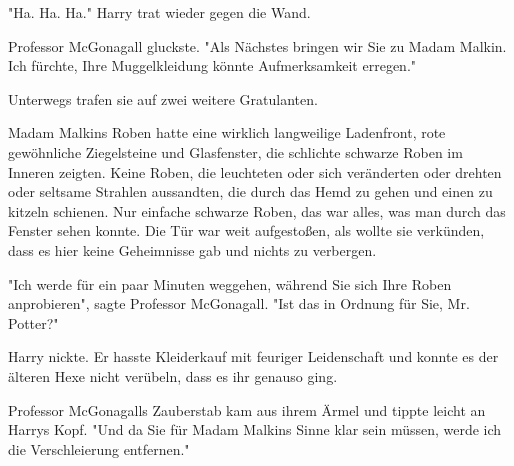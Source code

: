 "Ha. Ha. Ha." Harry trat wieder gegen die Wand.

Professor McGonagall gluckste. "Als Nächstes bringen wir Sie zu Madam Malkin. Ich fürchte, Ihre Muggelkleidung könnte Aufmerksamkeit erregen." 

Unterwegs trafen sie auf zwei weitere Gratulanten.

Madam Malkins Roben hatte eine wirklich langweilige Ladenfront, rote gewöhnliche Ziegelsteine und Glasfenster, die schlichte schwarze Roben im Inneren zeigten. Keine Roben, die leuchteten oder sich veränderten oder drehten oder seltsame Strahlen aussandten, die durch das Hemd zu gehen und einen zu kitzeln schienen. Nur einfache schwarze Roben, das war alles, was man durch das Fenster sehen konnte. Die Tür war weit aufgestoßen, als wollte sie verkünden, dass es hier keine Geheimnisse gab und nichts zu verbergen. 

"Ich werde für ein paar Minuten weggehen, während Sie sich Ihre Roben anprobieren", sagte Professor McGonagall. "Ist das in Ordnung für Sie, Mr. Potter?" 

Harry nickte. Er hasste Kleiderkauf mit feuriger Leidenschaft und konnte es der älteren Hexe nicht verübeln, dass es ihr genauso ging.

Professor McGonagalls Zauberstab kam aus ihrem Ärmel und tippte leicht an Harrys Kopf. "Und da Sie für Madam Malkins Sinne klar sein müssen, werde ich die Verschleierung entfernen." 

